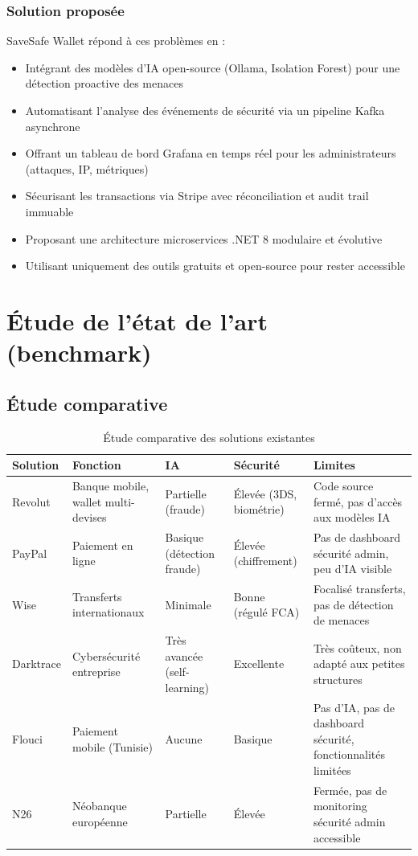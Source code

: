 \documentclass[12pt,a4paper]{report}
\begin{document}
\subsection{Solution proposée}
SaveSafe Wallet répond à ces problèmes en :
\begin{itemize}[leftmargin=*,label=--]
\item Intégrant des modèles d'IA open-source (Ollama, Isolation Forest) pour une détection proactive des menaces
\item Automatisant l'analyse des événements de sécurité via un pipeline Kafka asynchrone
\item Offrant un tableau de bord Grafana en temps réel pour les administrateurs (attaques, IP, métriques)
\item Sécurisant les transactions via Stripe avec réconciliation et audit trail immuable
\item Proposant une architecture microservices .NET 8 modulaire et évolutive
\item Utilisant uniquement des outils gratuits et open-source pour rester accessible
\end{itemize}

\chapter{Étude de l'état de l'art (benchmark)}

\section{Étude comparative}
\begin{table}[H]
\centering
\begin{tabular}{|p{2.5cm}|p{3.5cm}|p{2.5cm}|p{2.5cm}|p{4.5cm}|}
\hline
\textbf{Solution} & \textbf{Fonction} & \textbf{IA} & \textbf{Sécurité} & \textbf{Limites} \\
\hline
Revolut & Banque mobile, wallet multi-devises & Partielle (fraude) & Élevée (3DS, biométrie) & Code source fermé, pas d'accès aux modèles IA \\
\hline
PayPal & Paiement en ligne & Basique (détection fraude) & Élevée (chiffrement) & Pas de dashboard sécurité admin, peu d'IA visible \\
\hline
Wise & Transferts internationaux & Minimale & Bonne (régulé FCA) & Focalisé transferts, pas de détection de menaces \\
\hline
Darktrace & Cybersécurité entreprise & Très avancée (self-learning) & Excellente & Très coûteux, non adapté aux petites structures \\
\hline
Flouci & Paiement mobile (Tunisie) & Aucune & Basique & Pas d'IA, pas de dashboard sécurité, fonctionnalités limitées \\
\hline
N26 & Néobanque européenne & Partielle & Élevée & Fermée, pas de monitoring sécurité admin accessible \\
\hline
\end{tabular}
\caption{Étude comparative des solutions existantes}
\end{table}
\end{document}
